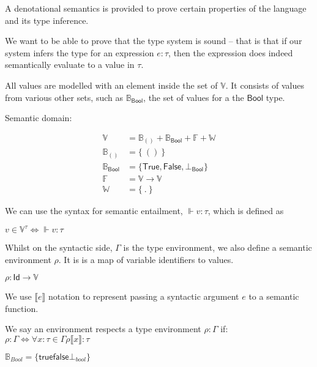 A denotational semantics is provided to prove certain properties of
the language and its type inference.

We want to be able to prove that the type system is sound -- that is
that if our system infers the type for an expression $e : \tau$, then the
expression does indeed semantically evaluate to a value in $\tau$.

All values are modelled with an element inside the set of
$\mathbb{V}$.
It consists of values from various other sets, such as
$\mathbb{B}_{\mathsf{Bool}}$, the set of values for a the
$\mathsf{Bool}$ type.

Semantic domain:

\begin{align*}
  \mathbb{V} &= \mathbb{B}_{()} + \mathbb{B}_{\textsf{Bool}} + \mathbb{F} +
               \mathbb{W} \\
  \mathbb{B}_{()} &= \{ \ () \ \} \\
  \mathbb{B}_{\mathsf{Bool}} &=
                               \{ \textsf{True}, \textsf{False},
                               \bot_{\textsf{Bool}} \} \\
  \mathbb{F} &= \mathbb{V} \rightarrow \mathbb{V} \\
  \mathbb{W} &= \{ \ . \ \}
\end{align*}


We can use the syntax for semantic entailment, $\Vdash v : \tau$, which is
defined as

\begin{math}
  v \in \mathbb{V}^\tau \iff \Vdash v : \tau
\end{math}

Whilst on the syntactic side, $\Gamma$ is the type environment, we also
define a semantic environment $\rho$. It is is a map of variable
identifiers to values.

\begin{math}
  \rho : \textsf{Id} \rightarrow \mathbb{V}
\end{math}


We use $\llbracket e \rrbracket$ notation to represent passing a
syntactic argument $e$ to a semantic function.

We say an environment respects a type environment $\rho : \Gamma$ if:
\begin{math}
  \rho : \Gamma \iff \forall x : \tau \in \Gamma \rho \llbracket x \rrbracket : \tau
\end{math}


$\mathbb{B}_{Bool} = \{ \textsf{true} \textsf{false} \bot_{bool} \}$

